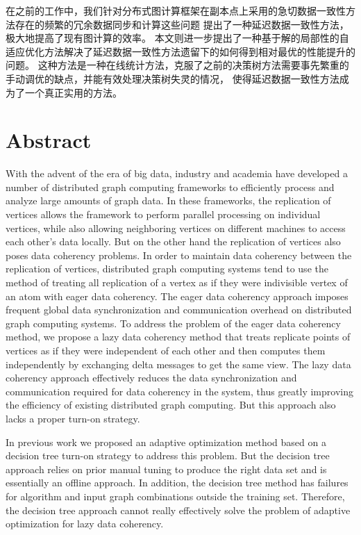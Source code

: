 在之前的工作中，我们针对分布式图计算框架在副本点上采用的急切数据一致性方法存在的频繁的冗余数据同步和计算这些问题
提出了一种延迟数据一致性方法，极大地提高了现有图计算的效率。
本文则进一步提出了一种基于解的局部性的自适应优化方法解决了延迟数据一致性方法遗留下的如何得到相对最优的性能提升的问题。
这种方法是一种在线统计方法，克服了之前的决策树方法需要事先繁重的手动调优的缺点，并能有效处理决策树失灵的情况，
使得延迟数据一致性方法成为了一个真正实用的方法。



\intobmk\chapter*{Abstract}%

With the advent of the era of big data, industry and academia have developed a number of distributed graph computing frameworks to efficiently process and analyze large amounts of graph data.
In these frameworks, the replication of vertices allows the framework to perform parallel processing on individual vertices, while also allowing neighboring vertices on different machines to access each other's data locally.
But on the other hand the replication of vertices also poses data coherency problems.
In order to maintain data coherency between the replication of vertices, distributed graph computing systems tend to use the method of treating all  replication of a vertex as if they were indivisible vertex of an atom with eager data coherency.
The eager data coherency approach imposes frequent global data synchronization and communication overhead on distributed graph computing systems.
To address the problem of the eager data coherency method, we propose a lazy data coherency method that treats replicate points of vertices as if they were independent of each other and then computes them independently by exchanging delta messages to get the same view.
The lazy data coherency approach effectively reduces the data synchronization and communication required for data coherency in the system, thus greatly improving the efficiency of existing distributed graph computing.
But this approach also lacks a proper turn-on strategy.

In previous work we proposed an adaptive optimization method based on a decision tree turn-on strategy to address this problem.
But the decision tree approach relies on prior manual tuning to produce the right data set and is essentially an offline approach.
In addition, the decision tree method has failures for algorithm and input graph combinations outside the training set.
Therefore, the decision tree approach cannot really effectively solve the problem of adaptive optimization for lazy data coherency.


